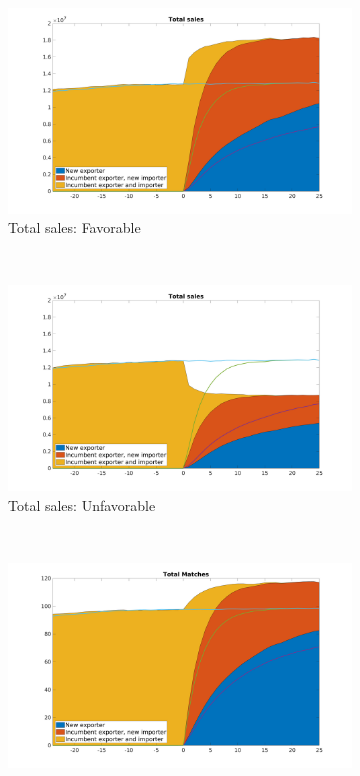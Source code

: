 \documentclass[12pt]{article}
\begin{document}
\begin{figure}[tbp]
\centering
\begin{subfigure}[b]{0.45\textwidth}
        \centering
        \includegraphics[width=\textwidth]{figures/total_sales}
        \caption{Total sales: Favorable}
    \end{subfigure} ~ 
\begin{subfigure}[b]{0.45\textwidth}
        \centering
        \includegraphics[width=\textwidth]{figures/total_sales_unf}
        \caption{Total sales: Unfavorable}
    \end{subfigure} \newline
~ 
\begin{subfigure}[b]{0.45\textwidth}
        \centering
        \includegraphics[width=\textwidth]{figures/total_matches}

\end{subfigure}
\end{figure}
\end{document}
